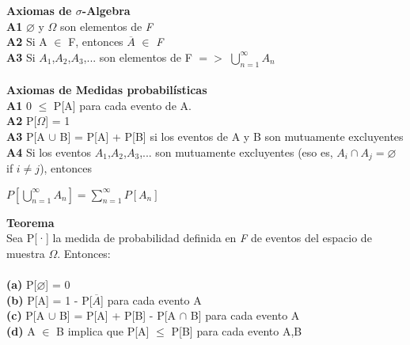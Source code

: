 \begin{minipage}{0.22\textwidth}
	{\bf Axiomas de $\sigma$-Algebra} \\
	{\bf A1} $\varnothing$ y $\Omega$ son elementos de {\textit{F}} \\
	{\bf A2} Si A $\in$ F, entonces $\overline{A}$ $\in$ {\textit{F}} \\
	{\bf A3} Si $A_1$,$A_2$,$A_3$,... son elementos de F $=>$ $\bigcup\limits_{n=1}^{\infty} A_{n}$ \\
	\\
	{\bf Axiomas de Medidas probabilísticas} \\
	{\bf A1} 0 $\le$ P[A] para cada evento de A. \\
	{\bf A2} P[$\Omega$] = 1 \\
	{\bf A3} P[A $\cup$ B] = P[A] + P[B] si los eventos de A y B son mutuamente excluyentes \\
	{\bf A4} Si los eventos $A_1$,$A_2$,$A_3$,... son mutuamente excluyentes (eso es, $A_i \cap A_j = \varnothing$ if $i \ne j$), entonces \\
	\begin{center} $P\left[\bigcup\limits_{n=1}^{\infty} A_{n}\right] = \sum\limits_{n=1}^{\infty} P[A_n]$ \end{center}
	{\bf Teorema} \\
	Sea P[·] la medida de probabilidad definida en {\textit{F}} de eventos del espacio de muestra $\Omega$. Entonces: \\
	\\
	{\bf (a)} P[$\varnothing$] = 0 \\
	{\bf (b)} P[A] = 1 - P[$\overline{A}$] para cada evento A \\
	{\bf (c)} P[A $\cup$ B] = P[A] + P[B] - P[A $\cap$ B] para cada evento A \\
	{\bf (d)} A $\in$ B implica que P[A] $\le$ P[B] para cada evento A,B \\
\end{minipage}
\vfill\null
\columnbreak
